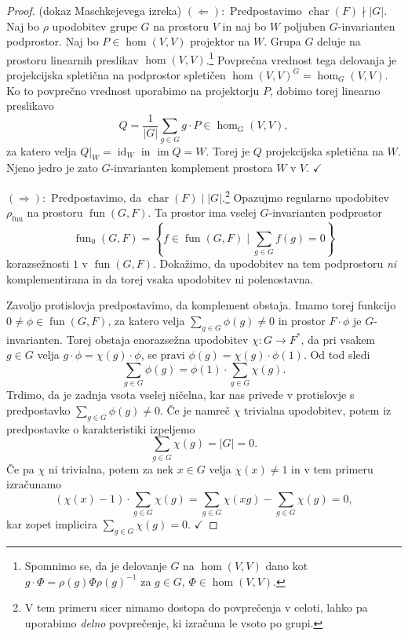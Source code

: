 \documentclass[11pt]{book}
\DeclareMathOperator\image{im}
\DeclareMathOperator\characteristic{char}
\DeclareMathOperator\fun{fun}
\DeclareMathOperator\id{id}
\def\kljuka{$\checkmark$}
\theoremstyle{definition}
\theoremstyle{zgled}
\theoremstyle{zgledbrezstevilke}
\theoremstyle{odprtproblem}
\theoremstyle{domacanaloga}
\newenvironment{dokaz}
    {\color{siva}\begin{proof}}
    {\end{proof}}
\theoremstyle{izrek}
\begin{document}
\begin{dokaz}(dokaz Maschkejevega izreka) $(\Leftarrow):$ Predpostavimo $\characteristic(F) \nmid |G|$. Naj bo $\rho$ upodobitev grupe $G$ na prostoru $V$ in naj bo $W$ poljuben $G$-invarianten podprostor. Naj bo $P \in \hom(V,V)$ projektor na $W$. Grupa $G$ deluje na prostoru linearnih preslikav $\hom(V,V)$.\footnote{Spomnimo se, da je delovanje $G$ na $\hom(V,V)$ dano kot $g \cdot \Phi = \rho(g) \Phi \rho(g)^{-1}$ za $g \in G$, $\Phi \in \hom(V,V)$.} Povprečna vrednost tega delovanja je projekcijska spletična na podprostor spletičen $\hom(V,V)^G = \hom_G(V,V)$. Ko to povprečno vrednost uporabimo na projektorju $P$, dobimo torej linearno preslikavo
\[
    Q = \frac{1}{|G|} \sum_{g \in G} g \cdot P \in \hom_G(V,V),
\]
za katero velja $Q|_W = \id_W$ in $\image Q = W$. Torej je $Q$ projekcijska spletična na $W$. Njeno jedro je zato $G$-invarianten komplement prostora $W$ v $V$. \kljuka

$(\Rightarrow):$ Predpostavimo, da $\characteristic(F) \mid |G|$.\footnote{V tem primeru sicer nimamo dostopa do povprečenja v celoti, lahko pa uporabimo \emph{delno} povprečenje, ki izračuna le vsoto po grupi.} Opazujmo regularno upodobitev $\rho_{\fun}$ na prostoru $\fun(G,F)$. Ta prostor ima vselej $G$-invarianten podprostor
\[
    \textstyle \fun_0(G,F) = \left\{ f \in \fun(G,F) \mid \sum_{g \in G} f(g) = 0 \right\}
\]
korazsežnosti $1$ v $\fun(G,F)$. Dokažimo, da upodobitev na tem podprostoru \emph{ni} komplementirana in da torej vsaka upodobitev ni polenostavna. 

Zavoljo protislovja predpostavimo, da komplement obstaja. Imamo torej funkcijo $0 \neq \phi \in \fun(G,F)$, za katero velja $\sum_{g \in G} \phi(g) \neq 0$ in prostor $F \cdot \phi$ je $G$-invarianten. Torej obstaja enorazsežna upodobitev $\chi \colon G \to F^*$, da pri vsakem $g \in G$ velja $g \cdot \phi = \chi(g) \cdot \phi$, se pravi $\phi(g) = \chi(g) \cdot \phi(1)$. Od tod sledi 
\[
    \sum_{g \in G} \phi(g) = \phi(1) \cdot \sum_{g \in G} \chi(g).
\]
Trdimo, da je zadnja vsota vselej ničelna, kar nas privede v protislovje s predpostavko $\sum_{g \in G} \phi(g) \neq 0$. Če je namreč $\chi$ trivialna upodobitev, potem iz predpostavke o karakteristiki izpeljemo
\[
    \sum_{g \in G} \chi(g) = |G| = 0.
\]
Če pa $\chi$ ni trivialna, potem za nek $x \in G$ velja $\chi(x) \neq 1$ in v tem primeru izračunamo
\[
    (\chi(x) - 1) \cdot \sum_{g \in G} \chi(g) = \sum_{g \in G} \chi(xg) - \sum_{g \in G} \chi(g) = 0,
\]
kar zopet implicira $\sum_{g \in G} \chi(g) = 0$. \kljuka
\end{dokaz}
\end{document}

